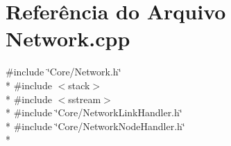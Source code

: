 \section{Referência do Arquivo Network.\+cpp}
\label{_network_8cpp}
{\ttfamily \#include \char`\"{}Core/\+Network.\+h\char`\"{}}\\*
{\ttfamily \#include $<$stack$>$}\\*
{\ttfamily \#include $<$sstream$>$}\\*
{\ttfamily \#include \char`\"{}Core/\+Network\+Link\+Handler.\+h\char`\"{}}\\*
{\ttfamily \#include \char`\"{}Core/\+Network\+Node\+Handler.\+h\char`\"{}}\\*
